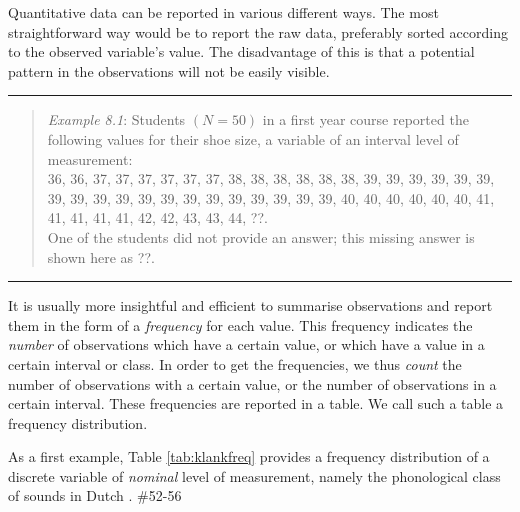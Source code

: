 \documentclass[
]{book}
\begin{document}
Quantitative data can be reported in various different ways.
The most straightforward way would be to report the raw data, preferably
sorted according to the observed variable's value.
The disadvantage of this is that a potential pattern in the observations
will not be easily visible.

\begin{center}\rule{0.5\linewidth}{0.5pt}\end{center}

\begin{quote}
\emph{Example 8.1}: Students \((N=50)\) in a first year
course reported the following values for their shoe size, a
variable of an interval level of measurement:\\
36, 36, 37, 37, 37, 37, 37, 37, 38, 38, 38, 38, 38, 38, 39, 39, 39, 39,
39, 39, 39, 39, 39, 39, 39, 39, 39, 39, 39, 39, 39, 39, 39, 40, 40, 40,
40, 40, 40, 41, 41, 41, 41, 41, 42, 42, 43, 43, 44, ??.\\
One of the students did not provide an answer; this missing answer is
shown here as ??.
\end{quote}

\begin{center}\rule{0.5\linewidth}{0.5pt}\end{center}

It is usually more insightful and efficient to summarise observations
and report them in the form of a \emph{frequency} for each value.
This frequency indicates the \emph{number} of observations which have a certain value,
or which have a value in a certain interval or class. In order to get
the frequencies, we thus \emph{count} the number of observations with a certain
value, or the number of observations in a certain interval. These
frequencies are reported in a table. We call such a table a
frequency distribution.

As a first example, Table \ref{tab:klankfreq} provides a
frequency distribution of a discrete variable of \emph{nominal} level of measurement,
namely the phonological class of sounds in Dutch \citep{LKCG07}.
\#52-56
\end{document}
